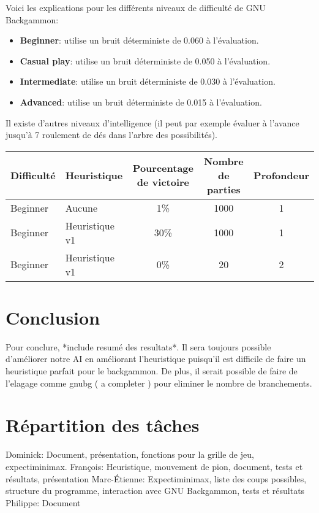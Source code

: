 \documentclass{article}
\begin{document}
Voici les explications pour les différents niveaux de difficulté de GNU
Backgammon:
\begin{itemize}
    \item \textbf{Beginner}: utilise un bruit déterministe de 0.060 à l’évaluation.
    \item \textbf{Casual play}: utilise un bruit déterministe de 0.050 à
        l’évaluation.
    \item \textbf{Intermediate}: utilise un bruit déterministe de 0.030 à
        l’évaluation.
    \item \textbf{Advanced}: utilise un bruit déterministe de 0.015 à l’évaluation.
\end{itemize}
Il existe d’autres niveaux d’intelligence (il peut par exemple évaluer à
l’avance jusqu’à 7 roulement de dés dans l’arbre des possibilités).

\begin{center}
    \begin{tabular}{| l | l | c | c | c |}
        \hline
        \textbf{Difficulté} & \textbf{Heuristique} & \textbf{Pourcentage de
    victoire} & \textbf{Nombre de parties} &
        \textbf{Profondeur}\\
        \hline
        Beginner & Aucune & 1\% & 1000 & 1 \\
        Beginner & Heuristique v1 & 30\% & 1000 & 1 \\
        Beginner & Heuristique v1 & 0\% & 20 & 2 \\
        \hline
    \end{tabular}
\end{center}

\section{Conclusion}
Pour conclure,  *include resumé des resultats*. Il sera toujours possible
d’améliorer notre AI en améliorant l’heuristique puisqu’il est difficile de
faire un heuristique parfait pour le backgammon. De plus, il serait possible de
faire de l’elagage comme gnubg ( a completer ) pour eliminer le nombre de
branchements.
\section{Répartition des tâches}
Dominick: Document, présentation, fonctions pour la grille de jeu,
expectiminimax.
François: Heuristique, mouvement de pion, document, tests et résultats,
présentation
Marc-Étienne: Expectiminimax, liste des coups possibles, structure du programme,
interaction avec GNU Backgammon, tests et résultats
Philippe: Document
\end{document}
